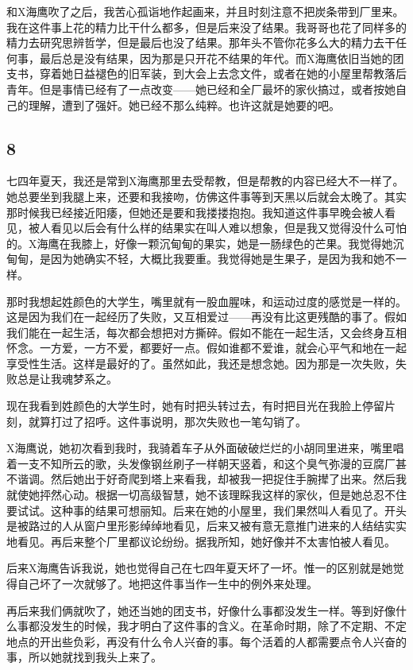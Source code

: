 和X海鹰吹了之后，我苦心孤诣地作起画来，并且时刻注意不把炭条带到厂里来。我在这件事上花的精力比干什么都多，但是后来没了结果。我哥哥也花了同样多的精力去研究思辨哲学，但是最后也没了结果。那年头不管你花多么大的精力去干任何事，最后总是没有结果，因为那是只开花不结果的年代。而X海鹰依旧当她的团支书，穿着她日益褪色的旧军装，到大会上去念文件，或者在她的小屋里帮教落后青年。但是事情已经有了一点改变——她已经和全厂最坏的家伙搞过，或者按她自己的理解，遭到了强奸。她已经不那么纯粹。也许这就是她要的吧。 

\subsection{8} 

七四年夏天，我还是常到X海鹰那里去受帮教，但是帮教的内容已经大不一样了。她总要坐到我腿上来，还要和我接吻，仿佛这件事等到天黑以后就会太晚了。其实那时候我已经接近阳痿，但她还是要和我搂搂抱抱。我知道这件事早晚会被人看见，被人看见以后会有什么样的结果实在叫人难以想象，但是我又觉得没什么可怕的。X海鹰在我膝上，好像一颗沉甸甸的果实，她是一肠绿色的芒果。我觉得她沉甸甸，是因为她确实不轻，大概比我要重。我觉得她是生果子，是因为我和她不一样。 

那时我想起姓颜色的大学生，嘴里就有一股血腥味，和运动过度的感觉是一样的。这是因为我们在一起经历了失败，又互相爱过——再没有比这更残酷的事了。假如我们能在一起生活，每次都会想把对方撕碎。假如不能在一起生活，又会终身互相怀念。一方爱，一方不爱，都要好一点。假如谁都不爱谁，就会心平气和地在一起享受性生活。这样是最好的了。虽然如此，我还是想念她。因为那是一次失败，失败总是让我魂梦系之。 

现在我看到姓颜色的大学生时，她有时把头转过去，有时把目光在我脸上停留片刻，就算打过了招呼。这件事说明，那次失败也一笔勾销了。 

X海鹰说，她初次看到我时，我骑着车子从外面破破烂烂的小胡同里进来，嘴里唱着一支不知所云的歌，头发像钢丝刷子一样朝天竖着，和这个臭气弥漫的豆腐厂甚不谐调。然后她出于好奇爬到塔上来看我，却被我一把捉住手腕撵了出来。然后我就使她抨然心动。根据一切高级智慧，她不该理睬我这样的家伙，但是她总忍不住要试试。这种事的结果可想丽知。后来在她的小屋里，我们果然叫人看见了。开头是被路过的人从窗户里形影绰绰地看见，后来又被有意无意推门进来的人结结实实地看见。再后来整个厂里都议论纷纷。据我所知，她好像并不太害怕被人看见。 

后来X海鹰告诉我说，她也觉得自己在七四年夏天坏了一坏。惟一的区别就是她觉得自己坏了一次就够了。地把这件事当作一生中的例外来处理。 

再后来我们俩就吹了，她还当她的团支书，好像什么事都没发生一样。等到好像什么事都没发生的时候，我才明白了这件事的含义。在革命时期，除了不定期、不定地点的开出些负彩，再没有什么令人兴奋的事。每个活着的人都需要点令人兴奋的事，所以她就找到我头上来了。 

